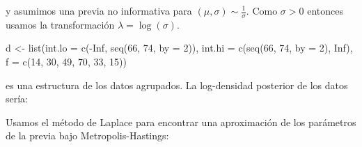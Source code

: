 \documentclass[
  12pt,
]{book}
\newenvironment{Shaded}{\begin{snugshade}}{\end{snugshade}}
\newcommand{\AttributeTok}[1]{\textcolor[rgb]{0.77,0.63,0.00}{#1}}
\newcommand{\ConstantTok}[1]{\textcolor[rgb]{0.00,0.00,0.00}{#1}}
\newcommand{\ControlFlowTok}[1]{\textcolor[rgb]{0.13,0.29,0.53}{\textbf{#1}}}
\newcommand{\DecValTok}[1]{\textcolor[rgb]{0.00,0.00,0.81}{#1}}
\newcommand{\FunctionTok}[1]{\textcolor[rgb]{0.00,0.00,0.00}{#1}}
\newcommand{\NormalTok}[1]{#1}
\newcommand{\OtherTok}[1]{\textcolor[rgb]{0.56,0.35,0.01}{#1}}
\newcommand{\SpecialCharTok}[1]{\textcolor[rgb]{0.00,0.00,0.00}{#1}}
\theoremstyle{definition}
\theoremstyle{definition}
\theoremstyle{definition}
\theoremstyle{definition}
\theoremstyle{remark}
\begin{document}
y asumimos una previa no informativa para \((\mu,\sigma)\sim \frac 1 \sigma\). Como \(\sigma>0\) entonces usamos la transformación \(\lambda=\log (\sigma)\).

\begin{Shaded}
\begin{Highlighting}[]
\NormalTok{d }\OtherTok{\textless{}{-}} \FunctionTok{list}\NormalTok{(}\AttributeTok{int.lo =} \FunctionTok{c}\NormalTok{(}\SpecialCharTok{{-}}\ConstantTok{Inf}\NormalTok{, }\FunctionTok{seq}\NormalTok{(}\DecValTok{66}\NormalTok{, }\DecValTok{74}\NormalTok{, }\AttributeTok{by =} \DecValTok{2}\NormalTok{)), }\AttributeTok{int.hi =} \FunctionTok{c}\NormalTok{(}\FunctionTok{seq}\NormalTok{(}\DecValTok{66}\NormalTok{,}
    \DecValTok{74}\NormalTok{, }\AttributeTok{by =} \DecValTok{2}\NormalTok{), }\ConstantTok{Inf}\NormalTok{), }\AttributeTok{f =} \FunctionTok{c}\NormalTok{(}\DecValTok{14}\NormalTok{, }\DecValTok{30}\NormalTok{, }\DecValTok{49}\NormalTok{, }\DecValTok{70}\NormalTok{, }\DecValTok{33}\NormalTok{, }\DecValTok{15}\NormalTok{))}
\end{Highlighting}
\end{Shaded}

es una estructura de los datos agrupados. La log-densidad posterior de los datos sería:

\begin{Shaded}
\end{Shaded}

Usamos el método de Laplace para encontrar una aproximación de los parámetros de la previa bajo Metropolis-Hastings:
\end{document}
